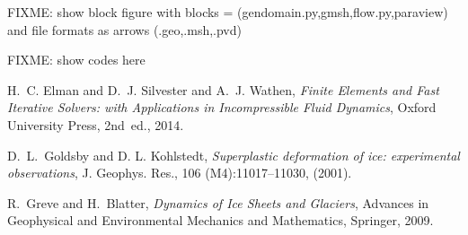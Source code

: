 \documentclass[letterpaper,final,12pt,reqno]{amsart}
\begin{document}
FIXME: show block figure with blocks = (gendomain.py,gmsh,flow.py,paraview) and file formats as arrows (.geo,.msh,.pvd)

FIXME: show codes here



\footnotesize

\bigskip

\begin{thebibliography}{4}






{\sc H.~C. Elman and D.~J. Silvester and A.~J. Wathen}, {\em Finite Elements
  and Fast Iterative Solvers: with Applications in Incompressible Fluid Dynamics},
  Oxford University Press, 2nd~ed., 2014.

{\sc D.~L.~Goldsby and D. L. Kohlstedt}, {\em Superplastic deformation of ice:
  experimental observations}, J. Geophys. Res., 106 (M4):11017--11030, (2001).

{\sc R.~Greve and H.~Blatter}, {\em Dynamics of {I}ce {S}heets and {G}laciers},
  Advances in Geophysical and Environmental Mechanics and Mathematics,
  Springer, 2009.


\end{thebibliography}
\end{document}
